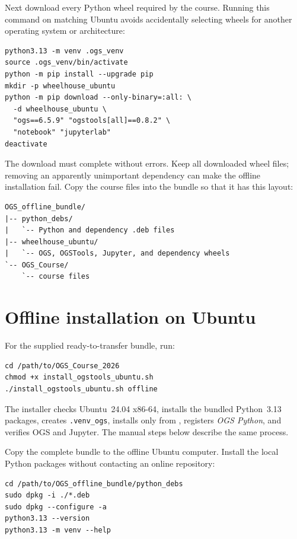\documentclass[11pt,a4paper]{tubaf-report}
\begin{document}
Next download every Python wheel required by the course. Running this command
on matching Ubuntu avoids accidentally selecting wheels for another operating
system or architecture:

\begin{lstlisting}[style=terminal]
python3.13 -m venv .ogs_venv
source .ogs_venv/bin/activate
python -m pip install --upgrade pip
mkdir -p wheelhouse_ubuntu
python -m pip download --only-binary=:all: \
  -d wheelhouse_ubuntu \
  "ogs==6.5.9" "ogstools[all]==0.8.2" \
  "notebook" "jupyterlab"
deactivate
\end{lstlisting}

The download must complete without errors. Keep all downloaded wheel files;
removing an apparently unimportant dependency can make the offline installation
fail. Copy the course files into the bundle so that it has this layout:

\begin{lstlisting}[style=terminal]
OGS_offline_bundle/
|-- python_debs/
|   `-- Python and dependency .deb files
|-- wheelhouse_ubuntu/
|   `-- OGS, OGSTools, Jupyter, and dependency wheels
`-- OGS_Course/
    `-- course files
\end{lstlisting}

\section{Offline installation on Ubuntu}

For the supplied ready-to-transfer bundle, run:

\begin{lstlisting}[style=terminal]
cd /path/to/OGS_Course_2026
chmod +x install_ogstools_ubuntu.sh
./install_ogstools_ubuntu.sh offline
\end{lstlisting}

The installer checks Ubuntu~24.04 x86-64, installs the bundled Python~3.13
packages, creates \texttt{.venv\_ogs}, installs only from
, registers \emph{OGS Python}, and verifies OGS
and Jupyter. The manual steps below describe the same process.

Copy the complete bundle to the offline Ubuntu computer. Install the local
Python packages without contacting an online repository:

\begin{lstlisting}[style=terminal]
cd /path/to/OGS_offline_bundle/python_debs
sudo dpkg -i ./*.deb
sudo dpkg --configure -a
python3.13 --version
python3.13 -m venv --help
\end{lstlisting}
\end{document}
